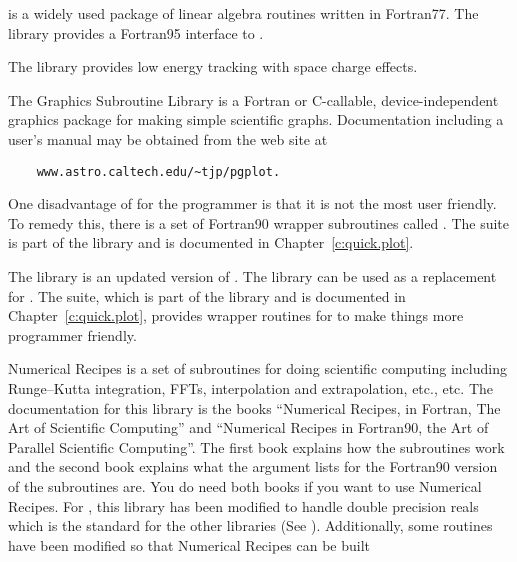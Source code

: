 {{{{{{\begin{description}
%
  \item[lapack / lapack95] \Newline
{} is a widely used package of linear algebra routines written in Fortran77. The
 library provides a Fortran95 interface to .
%
  \item[open_spacecharge] \Newline
The  library provides low energy tracking with space charge effects.
%
  \item[PGPLOT] \Newline
The  Graphics Subroutine Library is a Fortran or
C-callable, device-independent graphics package for making simple
scientific graphs. Documentation including a user's manual may be
obtained from the  web site at
\begin{verbatim}
    www.astro.caltech.edu/~tjp/pgplot.
\end{verbatim} 
One disadvantage of  for the programmer is that it is not the
most user friendly. To remedy this, there is a set of Fortran90
wrapper subroutines called .  The 
suite is part of the  library and is documented in
Chapter~\ref{c:quick.plot}.
%
  \item[plplot] \Newline
The  library is an updated version of . The 
library can be used as a replacement for . The 
suite, which is part of the  library and is documented in
Chapter~\ref{c:quick.plot}, provides wrapper routines for  to
make things more programmer friendly.
%
  \item[recipes] \Newline
Numerical Recipes is a set of subroutines for doing scientific
computing including Runge--Kutta integration, FFTs, interpolation and
extrapolation, etc., etc. The documentation for this library is the
books ``Numerical Recipes, in Fortran, The Art of Scientific
Computing'' and ``Numerical Recipes in Fortran90, the Art of Parallel
Scientific Computing''\cite{b:nr}.  The first book explains how the
subroutines work and the second book explains what the argument lists
for the Fortran90 version of the subroutines are. You do need both
books if you want to use Numerical Recipes. For \bmad, this library
has been modified to handle double precision reals which is the
standard for the other libraries (See ). Additionally,
some routines have been modified so that Numerical Recipes can be built

\end{description}}}}}}}

